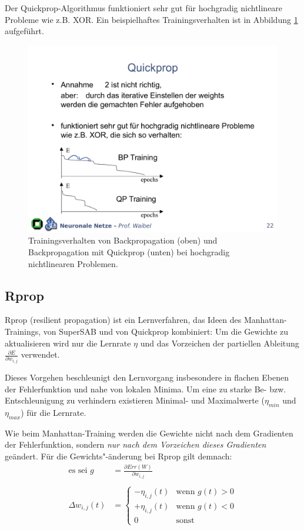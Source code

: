 Der Quickprop-Algorithmus funktioniert sehr gut für hochgradig nichtlineare Probleme wie z.B. XOR. Ein beispielhaftes Trainingsverhalten ist in Abbildung \ref{fig:ch03_quickprop-training} aufgeführt.

\begin{figure}[ht!] \centering 
	\includegraphics[width=0.7\linewidth]{figures/ch03_quickprop-training.pdf}
	\caption{Trainingsverhalten von Backpropagation (oben) und Backpropagation mit Quickprop (unten) bei hochgradig nichtlinearen Problemen.}
	\label{fig:ch03_quickprop-training}
\end{figure}

\subsection*{Rprop}
Rprop (resilient propagation) ist ein Lernverfahren, das Ideen des Manhattan-Trainings, von SuperSAB und von Quickprop kombiniert: Um die Gewichte zu aktualisieren wird nur die Lernrate $\eta$ und das Vorzeichen der partiellen Ableitung $\frac{\partial E}{\partial w_{i,j}}$ verwendet.

Dieses Vorgehen beschleunigt den Lernvorgang insbesondere in flachen Ebenen der Fehlerfunktion und nahe von lokalen Minima. Um eine zu starke Be- bzw. Entschleunigung zu verhindern existieren Minimal- und Maximalwerte ($\eta_{min}$ und $\eta_{max}$) für die Lernrate.

Wie beim Manhattan-Training werden die Gewichte nicht nach dem Gradienten der Fehlerfunktion, sondern \emph{nur nach dem Vorzeichen dieses Gradienten} geändert.
Für die Gewichts"-änderung bei Rprop gilt demnach:
\begin{align*}
	\text{es sei } g &= \frac{\partial Err(W)}{\partial w_{i,j}}\\\\
	\Delta w_{i,j} (t) &=
	\begin{cases}
		-\eta_{i,j} (t) &\text{wenn } g(t) > 0 \\
		+\eta_{i,j} (t) &\text{wenn } g(t) < 0 \\
		0 &\text{sonst} 
	\end{cases}
\end{align*}

